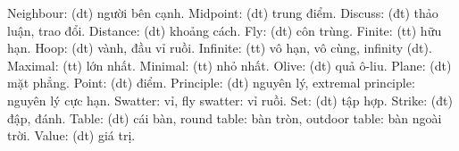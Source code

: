 \begin{multicols}{2}
	\vskip 0.1cm
	{\color{toancuabi}Neighbour}: (dt) người bên cạnh. 
	\vskip 0.1cm
	{\color{toancuabi}Midpoint}: (dt) trung điểm.
	\vskip 0.1cm
	{\color{toancuabi}Discuss}: (đt) thảo luận, trao đổi.
	\vskip 0.1cm
	{\color{toancuabi}Distance}: (dt) khoảng cách.
	\vskip 0.1cm
	{\color{toancuabi}Fly}: (dt) côn trùng.
	\vskip 0.1cm
	{\color{toancuabi}Finite}: (tt) hữu hạn.
	\vskip 0.1cm
	{\color{toancuabi}Hoop}: (dt) vành, đầu vỉ ruồi.
	\vskip 0.1cm
	{\color{toancuabi}Infinite}: (tt) vô hạn, vô cùng, infinity (dt). 
	\vskip 0.1cm
	{\color{toancuabi}Maximal}: (tt) lớn nhất.
	\vskip 0.1cm
	{\color{toancuabi}Minimal}: (tt) nhỏ nhất.
	\vskip 0.1cm
	{\color{toancuabi}Olive}: (dt) quả ô-liu. 
	\vskip 0.1cm
	{\color{toancuabi}Plane}: (dt) mặt phẳng.
	\vskip 0.1cm
	{\color{toancuabi}Point}: (dt) điểm.
	\vskip 0.1cm
	{\color{toancuabi}Principle}: (dt) nguyên lý,  {\color{toancuabi}extremal principle}: nguyên lý cực hạn.
	\vskip 0.1cm
	{\color{toancuabi}Swatter}: vỉ, {\color{toancuabi}fly swatter}: vỉ ruồi.
	\vskip 0.1cm
	{\color{toancuabi}Set}: (dt) tập hợp.
	\vskip 0.1cm
	{\color{toancuabi}Strike}: (đt) đập, đánh.
	\vskip 0.1cm
	{\color{toancuabi}Table}: (dt) cái bàn, {\color{toancuabi}round table}: bàn tròn, {\color{toancuabi}outdoor table}: bàn ngoài trời.
	\vskip 0.1cm
	{\color{toancuabi}Value}: (dt) giá trị.
	
\end{multicols}
